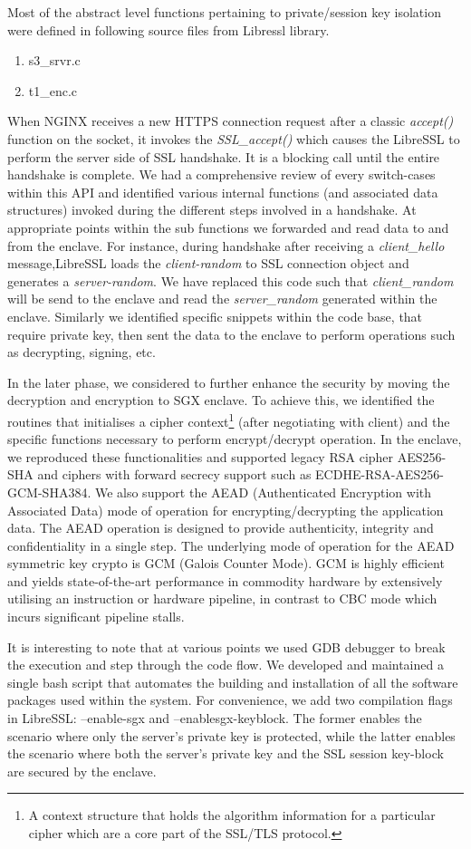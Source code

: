 \documentclass[../main.tex]{subfiles}
\begin{document}
Most of the abstract level functions pertaining to private/session key isolation were defined  
in following source files from Libressl library.
\begin{enumerate}
  \item s3\_srvr.c
  \item t1\_enc.c
\end{enumerate}
 
When NGINX receives a new HTTPS connection request after a classic \textit{accept()} function 
on the socket, it invokes the \textit{SSL\_accept()} which causes the LibreSSL to perform the 
server side of SSL handshake. It is a blocking call until the entire handshake is complete. 
We had a comprehensive review of every switch-cases within this API and identified various 
internal functions (and associated data structures) invoked during the different steps 
involved in a handshake. At appropriate points within the sub functions we forwarded and read 
data to and from the enclave. For instance, during handshake after receiving a \textit{client\_hello}
message,LibreSSL loads the \textit{client-random} to SSL connection object and generates a \textit{server-random}. 
We have replaced this code such that \textit{client\_random} will be send to the enclave and read
the \textit{server\_random} generated within the enclave. Similarly we identified specific snippets within
the code base, that require private key, then sent the data to the enclave to perform operations such as 
decrypting, signing, etc. 

In the later phase, we considered to further enhance the security by moving the decryption and encryption
to SGX enclave. To achieve this, we identified the routines that initialises a cipher context\footnote{A 
context structure that holds the algorithm information for a particular cipher which are a core part
of the SSL/TLS protocol.} (after negotiating with client) and the specific functions necessary
to perform encrypt/decrypt operation. In the enclave, we reproduced these functionalities and 
supported legacy RSA cipher AES256-SHA and ciphers with forward secrecy support such as 
ECDHE-RSA-AES256-GCM-SHA384. We also support the AEAD (Authenticated Encryption with Associated Data)
mode of operation for encrypting/decrypting the application data. The AEAD operation is designed to 
provide authenticity, integrity and confidentiality in a single step. The underlying mode of operation
for the AEAD symmetric key crypto is GCM (Galois Counter Mode). GCM is highly efficient and yields 
state-of-the-art performance in commodity hardware by extensively utilising an instruction or 
hardware pipeline, in contrast to CBC mode which incurs significant pipeline stalls.

It is interesting to note that at various points we used GDB debugger to break the execution and
step through the code flow. We developed and maintained a single bash script that automates the 
building and installation of all the software packages used within the system. For convenience, 
we add two compilation flags in LibreSSL: –enable-sgx and –enablesgx-keyblock. The former enables
the scenario where only the server’s private key is protected, while the latter enables the scenario
where both the server’s private key and the SSL session key-block are secured by the enclave.
\end{document}
